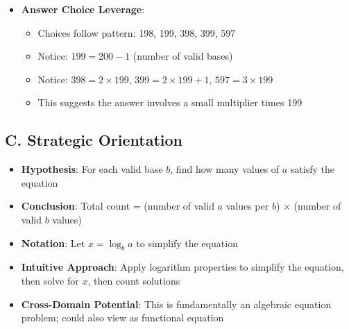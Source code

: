 \documentclass[]{article}
\begin{document}
\begin{problemconfigbox}
\begin{itemize}[leftmargin=*]
    \item \textbf{Answer Choice Leverage}: 
    \begin{itemize}
        \item Choices follow pattern: 198, 199, 398, 399, 597
        \item Notice: $199 = 200-1$ (number of valid bases)
        \item Notice: $398 = 2 \times 199$, $399 = 2 \times 199 + 1$, $597 = 3 \times 199$
        \item This suggests the answer involves a small multiplier times 199
    \end{itemize}
\end{itemize}

\subsection*{C. Strategic Orientation}
\begin{itemize}[leftmargin=*]
    \item \textbf{Hypothesis}: For each valid base $b$, find how many values of $a$ satisfy the equation
    
    \item \textbf{Conclusion}: Total count = (number of valid $a$ values per $b$) $\times$ (number of valid $b$ values)
    
    \item \textbf{Notation}: Let $x = \log_b a$ to simplify the equation
    
    \item \textbf{Intuitive Approach}: Apply logarithm properties to simplify the equation, then solve for $x$, then count solutions
    
    \item \textbf{Cross-Domain Potential}: This is fundamentally an algebraic equation problem; could also view as functional equation
\end{itemize}
\end{problemconfigbox}
\end{document}
